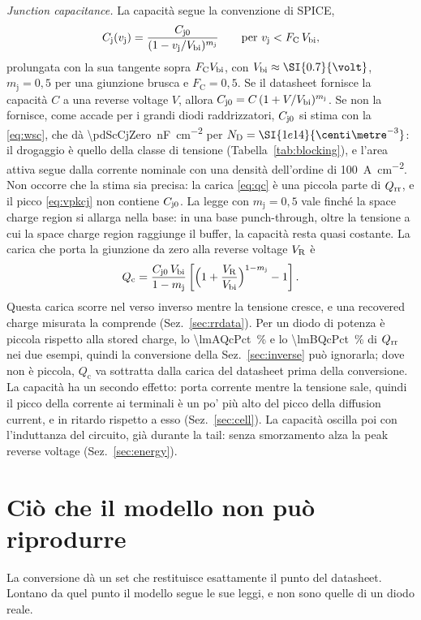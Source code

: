 \documentclass[10pt,a4paper]{scrartcl}
\let\newcommand\pdvaluedefine
\newcommand{\VR}{V_\mathrm{R}}
\newcommand{\Qrr}{Q_\mathrm{rr}}
\newcommand{\vj}{v_\mathrm{j}}
\newcommand{\Cj}{C_\mathrm{j}}
\newcommand{\Cjo}{C_\mathrm{j0}}
\newcommand{\ND}{N_\mathrm{D}}
\newcommand{\Vbi}{V_\mathrm{bi}}
\begin{document}
\emph{Junction capacitance.} La capacità segue la convenzione di SPICE,
\begin{equation}
\Cj(\vj) = \frac{\Cjo}{(1 - \vj/\Vbi)^{m_\mathrm{j}}} \qquad \text{per } \vj < F_\mathrm{C}\,\Vbi ,
\label{eq:cj}
\end{equation}
prolungata con la sua tangente sopra $F_\mathrm{C} \Vbi$, con $\Vbi \approx \SI{0.7}{\volt}$, $m_\mathrm{j} = 0,5$ per una giunzione brusca e $F_\mathrm{C} = 0,5$. Se il datasheet fornisce la capacità $C$ a una reverse voltage $V$, allora $\Cjo = C\,(1+V/\Vbi)^{m_\mathrm{j}}$. Se non la fornisce, come accade per i grandi diodi raddrizzatori, $\Cjo$ si stima con la \eqref{eq:wsc}, che dà \SI{\pdScCjZero}{\nano\farad\per\centi\metre\squared} per $\ND = \SI{1e14}{\centi\metre^{-3}}$: il drogaggio è quello della classe di tensione (Tabella~\ref{tab:blocking}), e l'area attiva segue dalla corrente nominale con una densità dell'ordine di \SI{100}{\ampere\per\centi\metre\squared}. Non occorre che la stima sia precisa: la carica \eqref{eq:qc} è una piccola parte di $\Qrr$, e il picco \eqref{eq:vpkcj} non contiene $\Cjo$. La legge con $m_\mathrm{j} = 0,5$ vale finché la space charge region si allarga nella base: in una base punch-through, oltre la tensione a cui la space charge region raggiunge il buffer, la capacità resta quasi costante. La carica che porta la giunzione da zero alla reverse voltage $\VR$ è
\begin{equation}
Q_\mathrm{c} = \frac{\Cjo\,\Vbi}{1-m_\mathrm{j}}\left[\Bigl(1+\frac{\VR}{\Vbi}\Bigr)^{1-m_\mathrm{j}} - 1\right] .
\label{eq:qc}
\end{equation}
Questa carica scorre nel verso inverso mentre la tensione cresce, e una recovered charge misurata la comprende (Sez.~\ref{sec:rrdata}). Per un diodo di potenza è piccola rispetto alla stored charge, lo \SI{\lmAQcPct}{\percent} e lo \SI{\lmBQcPct}{\percent} di $\Qrr$ nei due esempi, quindi la conversione della Sez.~\ref{sec:inverse} può ignorarla; dove non è piccola, $Q_\mathrm{c}$ va sottratta dalla carica del datasheet prima della conversione. La capacità ha un secondo effetto: porta corrente mentre la tensione sale, quindi il picco della corrente ai terminali è un po' più alto del picco della diffusion current, e in ritardo rispetto a esso (Sez.~\ref{sec:cell}). La capacità oscilla poi con l'induttanza del circuito, già durante la tail: senza smorzamento alza la peak reverse voltage (Sez.~\ref{sec:energy}).

\section{Ciò che il modello non può riprodurre}
\label{sec:limits}
La conversione dà un set che restituisce esattamente il punto del datasheet. Lontano da quel punto il modello segue le sue leggi, e non sono quelle di un diodo reale.
\end{document}
